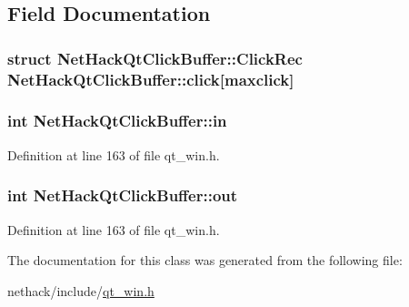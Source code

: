 \subsection{Field Documentation}
\hypertarget{classNetHackQtClickBuffer_a8d903805513acd57c5ca97ce283cf8ff}{
\subsubsection[{click}]{\setlength{\rightskip}{0pt plus 5cm}struct {\bf Net\+Hack\+Qt\+Click\+Buffer\+::\+Click\+Rec}  Net\+Hack\+Qt\+Click\+Buffer\+::click\mbox{[}{\bf maxclick}\mbox{]}\hspace{0.3cm}{\ttfamily [private]}}}\label{classNetHackQtClickBuffer_a8d903805513acd57c5ca97ce283cf8ff}
\hypertarget{classNetHackQtClickBuffer_a61ba4171499a295cc037983815bb6552}{
\subsubsection[{in}]{\setlength{\rightskip}{0pt plus 5cm}int Net\+Hack\+Qt\+Click\+Buffer\+::in\hspace{0.3cm}{\ttfamily [private]}}}\label{classNetHackQtClickBuffer_a61ba4171499a295cc037983815bb6552}


Definition at line 163 of file qt\+\_\+win.\+h.

\hypertarget{classNetHackQtClickBuffer_a609a875071b98553ccb3fa3126dd8244}{
\subsubsection[{out}]{\setlength{\rightskip}{0pt plus 5cm}int Net\+Hack\+Qt\+Click\+Buffer\+::out\hspace{0.3cm}{\ttfamily [private]}}}\label{classNetHackQtClickBuffer_a609a875071b98553ccb3fa3126dd8244}


Definition at line 163 of file qt\+\_\+win.\+h.



The documentation for this class was generated from the following file\+:\begin{DoxyCompactItemize}
\item 
nethack/include/\hyperlink{qt__win_8h}{qt\+\_\+win.\+h}\end{DoxyCompactItemize}
